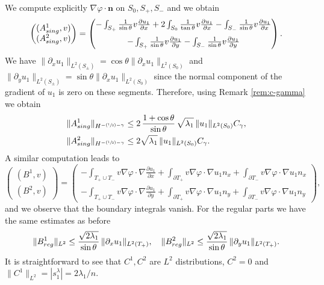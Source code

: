 \documentclass[11pt]{article}
\numberwithin{equation}{section}\newtheorem*{jepEnonce}{\jepEnonceTitle}\newenvironment{enonce*}[1]{\def\jepEnonceTitle{#1}\jepEnonce}{\endjepEnonce}\newtheorem*{conj*}{Conjecture}
\newcommand{\Psfrac}[2]{(\sfrac{#1}{#2})}
\theoremstyle{plain}
\theoremstyle{definition}
\newcommand{\bo}[1]{{\boldsymbol#1}}
\newcommand{\reg}{\textup{reg}}
\newcommand{\sing}{\textup{sing}}
\newcommand{\lb}{\lambda}
\let\jepOriginalSfrac\sfrac
\renewcommand{\sfrac}[2]{{\jepOriginalSfrac{#1}{#2}}}
\begin{document}
We compute explicitly $\nabla \varphi \cdot \bo n$ on $S_0,S_+,S_-$ and we obtain
\[
\begin{pmatrix} (A^1_{\sing},v)\\ (A^2_{\sing},v) \end{pmatrix}
=\begin{pmatrix}-\int_{S_+}\frac{1}{\sin\theta} v \frac{\partial u_1}{\partial x}
+2\int_{S_0}\frac{1}{\tan \theta} v \frac{\partial u_1}{\partial x}
-\int_{S_-}\frac{1}{\sin\theta} v \frac{\partial u_1}{\partial x} \\[8pt]
-\int_{S_+}\frac{1}{\sin\theta} v \frac{\partial u_1}{\partial y}
-\int_{S_-}\frac{1}{\sin\theta} v \frac{\partial u_1}{\partial y}
\end{pmatrix}.
\]
We have $\|\partial_x u_1\|_{L^2(S_\pm)} = \cos \theta \|\partial_x u_1\|_{L^2(S_0)}$ and $\|\partial_y u_1\|_{L^2(S_\pm)} = \sin \theta \|\partial_x u_1\|_{L^2(S_0)}$ since the normal component of the gradient of $u_1$ is zero on these segments. Therefore, using Remark \ref{rem:c-gamma} we obtain
\begin{align*}
\|A^1_{\sing}\|_{H^{-\Psfrac 12-\gamma}} &\le 2\, \frac{1+ \cos \theta}{ \sin \theta}\, \sqrt{ \lb_1 }\, \|u_1\|_{L^2(S_0)}C_\gamma, \\
\|A^2_{\sing}\|_{H^{-\Psfrac 12-\gamma}} &\le 2 \sqrt{ \lb_1 }\, \|u_1 \|_{L^2(S_0)}C_\gamma.
\end{align*}
A similar computation leads to
\[
\begin{pmatrix} (B^1,v)\\ (B^2,v) \end{pmatrix} = \begin{pmatrix} - \int_{T_+\cup T_-} v \nabla \varphi \cdot \nabla \frac{\partial u_1 }{\partial x} + \int_{\partial T_+} v \nabla \varphi \cdot \nabla u_1 n_x +\int_{\partial T_-} v \nabla \varphi \cdot \nabla u_1 n_x\\[5pt]
- \int_{T_+\cup T_-} v \nabla \varphi \cdot \nabla \frac{\partial u_1 }{\partial y} +\int_{\partial T_+} v \nabla \varphi \cdot \nabla u_1 n_y +\int_{\partial T_-} v \nabla \varphi \cdot \nabla u_1 n_y \end{pmatrix},
\]
and we observe that the boundary integrals vanish. For the regular parts we have the same estimates as before
\[
\|B^1_{\reg}\|_{L^2} \leq \frac{\sqrt{2\lambda_1}}{\sin \theta}\, \|\partial_x u_1\|_{L^2(T_+)},\quad \|B^2_{\reg}\|_{L^2} \leq \frac{\sqrt{2\lambda_1}}{\sin \theta}\,\|\partial_y u_1\|_{L^2(T_+)}.
\]
It is straightforward to see that $C^1,C^2$ are $L^2$ distributions, $C^2 = 0$ and $\|C^1\|_{L^2} = |s_1^\lambda| = 2\lambda_1/n$.
\end{document}
